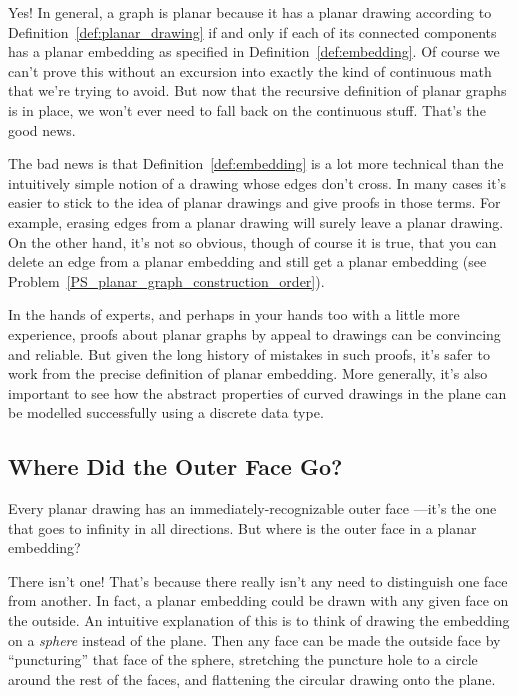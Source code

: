 Yes!  In general, a graph is planar because it has a planar drawing
according to Definition~\ref{def:planar_drawing} if and only if each
of its connected components has a planar embedding as specified in
Definition~\ref{def:embedding}.  Of course we can't prove this without
an excursion into exactly the kind of continuous math that we're
trying to avoid.  But now that the recursive definition of planar
graphs is in place, we won't ever need to fall back on the continuous
stuff.  That's the good news.

The bad news is that Definition~\ref{def:embedding} is a lot more
technical than the intuitively simple notion of a drawing whose edges
don't cross.  In many cases it's easier to stick to the idea of planar
drawings and give proofs in those terms.  For example, erasing edges
from a planar drawing will surely leave a planar drawing.  On the
other hand, it's not so obvious, though of course it is true, that you
can delete an edge from a planar embedding and still get a planar
embedding (see Problem~\ref{PS_planar_graph_construction_order}).

In the hands of experts, and perhaps in your hands too with a little
more experience, proofs about planar graphs by appeal to drawings can
be convincing and reliable.  But given the long history of mistakes in
such proofs, it's safer to work from the precise definition of planar
embedding.  More generally, it's also important to see how the
abstract properties of curved drawings in the plane can be modelled
successfully using a discrete data type.

\subsection{Where Did the Outer Face Go?}

Every planar drawing has an immediately-recognizable outer face
---it's the one that goes to infinity in all directions.  But where is
the outer face in a planar embedding?

There isn't one!  That's because there really isn't any need to
distinguish one face from another.  In fact, a planar embedding could
be drawn with any given face on the outside.  An intuitive explanation
of this is to think of drawing the embedding on a \emph{sphere}
instead of the plane.  Then any face can be made the outside face by
``puncturing'' that face of the sphere, stretching the puncture hole
to a circle around the rest of the faces, and flattening the circular
drawing onto the plane.

